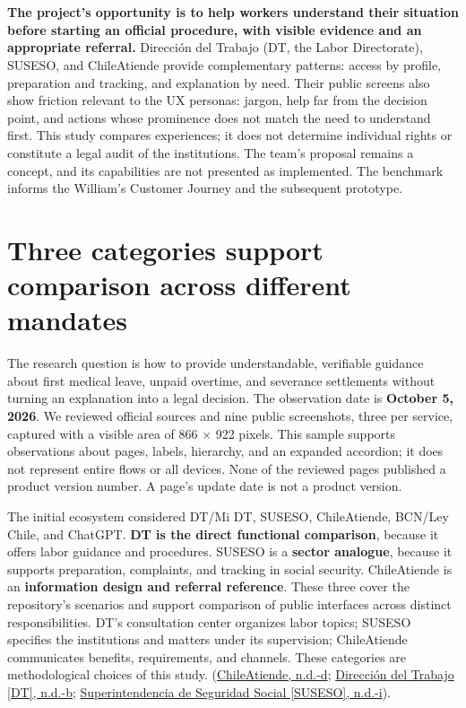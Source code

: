 \section*{\reportTitle}

\textbf{The project's opportunity is to help workers understand their situation before starting an official procedure, with visible evidence and an appropriate referral.} Dirección del Trabajo (DT, the Labor Directorate), SUSESO, and ChileAtiende provide complementary patterns: access by profile, preparation and tracking, and explanation by need. Their public screens also show friction relevant to the UX personas: jargon, help far from the decision point, and actions whose prominence does not match the need to understand first. This study compares experiences; it does not determine individual rights or constitute a legal audit of the institutions. The team's proposal remains a concept, and its capabilities are not presented as implemented. The benchmark informs the William's Customer Journey and the subsequent prototype.


\section{Three categories support comparison across different mandates}

The research question is how to provide understandable, verifiable guidance about first medical leave, unpaid overtime, and severance settlements without turning an explanation into a legal decision. The observation date is \textbf{October 5, 2026}. We reviewed official sources and nine public screenshots, three per service, captured with a visible area of 866 × 922 pixels. This sample supports observations about pages, labels, hierarchy, and an expanded accordion; it does not represent entire flows or all devices. None of the reviewed pages published a product version number. A page's update date is not a product version.


The initial ecosystem considered DT/Mi DT, SUSESO, ChileAtiende, BCN/Ley Chile, and ChatGPT. \textbf{DT is the direct functional comparison}, because it offers labor guidance and procedures. SUSESO is a \textbf{sector analogue}, because it supports preparation, complaints, and tracking in social security. ChileAtiende is an \textbf{information design and referral reference}. These three cover the repository's scenarios and support comparison of public interfaces across distinct responsibilities. DT's consultation center organizes labor topics; SUSESO specifies the institutions and matters under its supervision; ChileAtiende communicates benefits, requirements, and channels. These categories are methodological choices of this study. (\hyperref[ref:ca_descripcion]{ChileAtiende, n.d.-d}; \hyperref[ref:dt_consultas]{Dirección del Trabajo [DT], n.d.-b}; \hyperref[ref:su_competencia]{Superintendencia de Seguridad Social [SUSESO], n.d.-i}).


